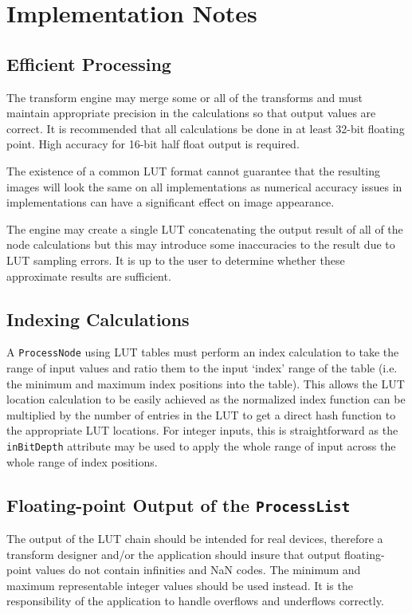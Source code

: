 \regularsectionformat
\chapter{Implementation Notes}
\label{sec:implementation}

\section{Efficient Processing}
The transform engine may merge some or all of the transforms and must maintain appropriate precision in the calculations so that output values are correct. It is recommended that all calculations be done in at least 32-bit floating point. High accuracy for 16-bit half float output is required.

The existence of a common LUT format cannot guarantee that the resulting images will look the same on all implementations as numerical accuracy issues in implementations can have a significant effect on image appearance.

The engine may create a single LUT concatenating the output result of all of the node calculations but this may introduce some inaccuracies to the result due to LUT sampling errors. It is up to the user to determine whether these approximate results are sufficient.  

\section{Indexing Calculations}
A \texttt{ProcessNode} using LUT tables must perform an index calculation to take the range of input values and ratio them to the input `index' range of the table (i.e. the minimum and maximum index positions into the table). This allows the LUT location calculation to be easily achieved as the normalized index function can be multiplied by the number of entries in the LUT to get a direct hash function to the appropriate LUT locations. For integer inputs, this is straightforward as the \texttt{inBitDepth} attribute may be used to apply the whole range of input across the whole range of index positions.

\section{Floating-point Output of the \texttt{ProcessList}}
The output of the LUT chain should be intended for real devices, therefore a transform designer and/or the application should insure that output floating-point values do not contain infinities and NaN codes. The minimum and maximum representable integer values should be used instead. It is the responsibility of the application to handle overflows and underflows correctly.

